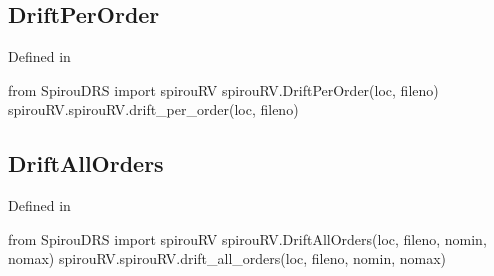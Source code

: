 \begin{minipage}{\textwidth}
\subsection{DriftPerOrder}

Defined in \spirouRV{}

\begin{pythonbox}
from SpirouDRS import spirouRV
spirouRV.DriftPerOrder(loc, fileno)
spirouRV.spirouRV.drift_per_order(loc, fileno)
\end{pythonbox}

\begin{pythondocstring}

\end{pythondocstring}
\end{minipage}

\begin{minipage}{\textwidth}
\subsection{DriftAllOrders}

Defined in \spirouRV{}

\begin{pythonbox}
from SpirouDRS import spirouRV
spirouRV.DriftAllOrders(loc, fileno, nomin, nomax)
spirouRV.spirouRV.drift_all_orders(loc, fileno, nomin, nomax)
\end{pythonbox}

\begin{pythondocstring}

\end{pythondocstring}
\end{minipage}

